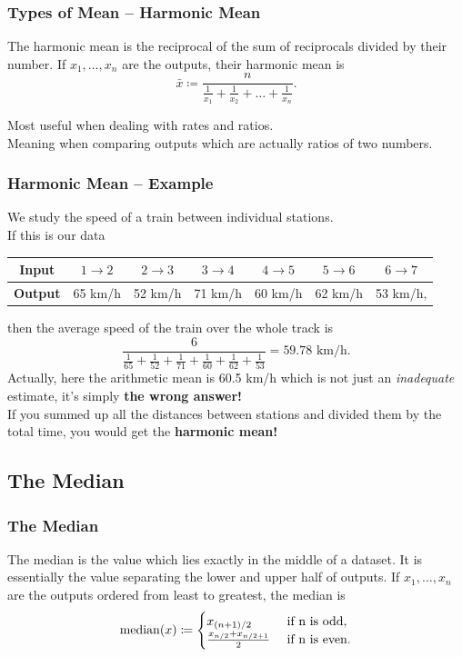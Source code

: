 \documentclass[aspectratio=169,11pt,svgnames]{beamer}
\begin{document}
\begin{frame}
 \frametitle{Types of Mean -- Harmonic Mean}
 \begin{tcolorbox}[title=Harmonic Mean]
  The \alert{harmonic mean} is the reciprocal of the sum of reciprocals divided
  by their number. If $x_1,\ldots,x_n$ are the outputs, their harmonic mean is
  \[
   \bar{x} \coloneqq \frac{n}{\frac{1}{x_1} + \frac{1}{x_2}
   +\ldots+\frac{1}{x_n}}.
  \]
 \end{tcolorbox}
 \pause
 Most useful when dealing with \alert{rates} and \alert{ratios}.\\
 \pause
 Meaning when comparing outputs which are actually ratios of two numbers.
\end{frame}

\begin{frame}
 \frametitle{Harmonic Mean -- Example}
 We study the speed of a train between individual stations.\\
 \pause
 If this is our data
 \begin{center}
  \begin{tabular}{c|cccccc}
   \textbf{Input} & $1 \to 2$ & $2 \to 3$ & $3 \to 4$ & $4 \to 5$ & $5 \to 6$ &
   $6 \to 7$\\
   \midrule
   \textbf{Output} & 65 km/h & 52 km/h & 71 km/h & 60 km/h & 62 km/h & 53 km/h,
  \end{tabular}
 \end{center}
 then the average speed of the train over the whole track is
 \[
  \frac{6}{\frac{1}{65} + \frac{1}{52} + \frac{1}{71} + \frac{1}{60} +
  \frac{1}{62} + \frac{1}{53}} = 59.78 \text{ km/h}.
 \]
 \pause
 Actually, here the arithmetic mean is 60.5 km/h which is not just an
 \emph{inadequate} estimate, it's simply \textbf{the wrong answer!}\\
 \pause
 If you summed up all the distances between stations and divided them by the
 total time, you would get the \textbf{harmonic mean!}
\end{frame}

\subsection{The Median}
\begin{frame}
 \frametitle{}
 \subsectionpage
\end{frame}

\begin{frame}
 \frametitle{The Median}
 \begin{tcolorbox}[title=Median]
  The \alert{median} is the value which lies exactly in the middle of a dataset.
  It is essentially the value separating the lower and upper half of outputs. If
  $x_1,\ldots,x_n$ are the outputs \alert{ordered from least to greatest}, the
  median is
  \[
   \mathrm{median}(x) \coloneqq 
   \begin{cases}
    x_{(n+1) / 2} & \text{ if } $n$ \text{ is odd},\\
    \frac{x_{n / 2} + x_{n / 2 + 1}}{2} & \text{ if } $n$ \text{ is even}.
   \end{cases}
  \]
 \end{tcolorbox}
\end{frame}
\end{document}
